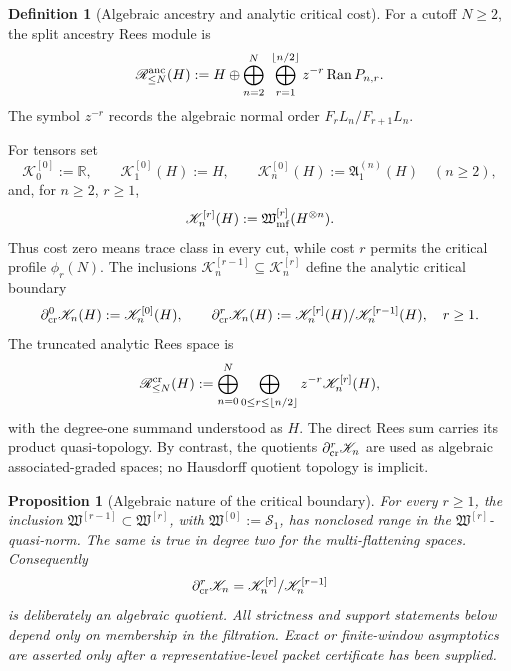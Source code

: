 \documentclass[10pt,reqno]{amsart}
\theoremstyle{plain}
\newtheorem{proposition}[theorem]{Proposition}
\theoremstyle{definition}
\newtheorem{definition}[theorem]{Definition}
\theoremstyle{remark}
\begin{document}
\begin{definition}[Algebraic ancestry and analytic critical cost]
\label{cc:def-ancestry-response-rees-modules}
For a cutoff \(N\ge2\), the split ancestry Rees module is
\begin{equation}
 \mathscr R^{\rm anc}_{\le N}(H)
 :=H\oplus
 \bigoplus_{n=2}^N\ \bigoplus_{r=1}^{\lfloor n/2\rfloor}
 z^{-r}\operatorname{Ran}P_{n,r}.
 \label{cc:eq-ancestry-rees-module}
\end{equation}
The symbol \(z^{-r}\) records the algebraic normal order
\(F_rL_n/F_{r+1}L_n\).

For tensors set
\begin{equation}
 \mathscr K_0^{[0]}:=\mathbb R,
 \qquad \mathscr K_1^{[0]}(H):=H,
 \qquad \mathscr K_n^{[0]}(H):=\mathfrak A_1^{(n)}(H)\quad(n\ge2),
 \label{cc:eq-cost-zero-spaces}
\end{equation}
and, for \(n\ge2\), \(r\ge1\),
\begin{equation}
 \mathscr K_n^{[r]}(H):=
 \mathfrak W_{\rm mf}^{[r]}(H^{\otimes n}).
 \label{cc:eq-positive-cost-spaces}
\end{equation}
Thus cost zero means trace class in every cut, while cost \(r\) permits the
critical profile \(\phi_r(N)\).  The inclusions
\(\mathscr K_n^{[r-1]}\subseteq\mathscr K_n^{[r]}\) define the analytic
critical boundary
\begin{equation}
 \partial_{\rm cr}^0\mathscr K_n(H):=\mathscr K_n^{[0]}(H),
 \qquad
 \partial_{\rm cr}^r\mathscr K_n(H)
 :=\mathscr K_n^{[r]}(H)/\mathscr K_n^{[r-1]}(H),
 \quad r\ge1.
 \label{cc:eq-critical-associated-graded}
\end{equation}
The truncated analytic Rees space is
\begin{equation}
 \mathscr R^{\rm cr}_{\le N}(H)
 :=\bigoplus_{n=0}^N
   \bigoplus_{0\le r\le\lfloor n/2\rfloor}
   z^{-r}\mathscr K_n^{[r]}(H),
 \label{cc:eq-response-rees-module}
\end{equation}
with the degree-one summand understood as \(H\).  The direct Rees sum carries
its product quasi-topology.  By contrast, the quotients
\(\partial_{\rm cr}^r\mathscr K_n\) are used as algebraic associated-graded
spaces; no Hausdorff quotient topology is implicit.
\end{definition}

\begin{proposition}[Algebraic nature of the critical boundary]
\label{cc:prop-algebraic-critical-boundary}
For every \(r\ge1\), the inclusion
\(\mathfrak W^{[r-1]}\subset\mathfrak W^{[r]}\), with
\(\mathfrak W^{[0]}:=\mathcal S_1\), has nonclosed range in the
\(\mathfrak W^{[r]}\)-quasi-norm.  The same is true in degree two for the
multi-flattening spaces.  Consequently
\[
 \partial_{\rm cr}^r\mathscr K_n
 =\mathscr K_n^{[r]}/\mathscr K_n^{[r-1]}
\]
is deliberately an algebraic quotient.  All strictness and support statements
below depend only on membership in the filtration.  Exact or finite-window
asymptotics are asserted only after a representative-level packet certificate
has been supplied.
\end{proposition}
\end{document}
